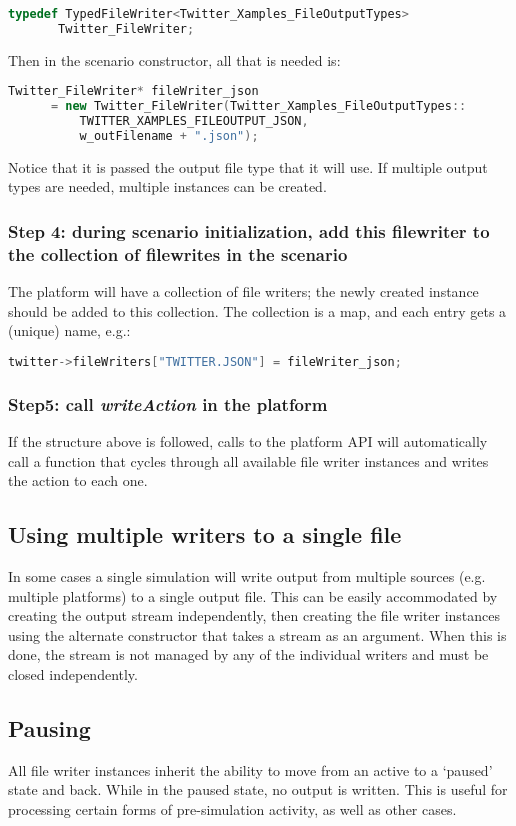 \begin{lstlisting}[frame=single, language=C++]
typedef TypedFileWriter<Twitter_Xamples_FileOutputTypes> 
       Twitter_FileWriter;
\end{lstlisting}

Then in the scenario constructor, all that is needed is:

\begin{lstlisting}[frame=single, language=C++]
Twitter_FileWriter* fileWriter_json 
      = new Twitter_FileWriter(Twitter_Xamples_FileOutputTypes::
          TWITTER_XAMPLES_FILEOUTPUT_JSON, 
          w_outFilename + ".json");
\end{lstlisting}

Notice that it is passed the output file type that it will use. If multiple output types are needed, multiple instances can be created.

\subsubsection{Step 4: during scenario initialization, add this filewriter to the collection of filewrites in the scenario}
The platform will have a collection of file writers; the newly created instance should be added to this collection. The collection is a map, and each entry gets a (unique) name, e.g.:

\begin{lstlisting}[frame=single, language=C++]
	twitter->fileWriters["TWITTER.JSON"] = fileWriter_json;
\end{lstlisting}

\subsubsection{Step5: call \textit{writeAction} in the platform}
If the structure above is followed, calls to the platform API will automatically call a function that cycles through all available file writer instances and writes the action to each one.

\subsection{Using multiple writers to a single file}
In some cases a single simulation will write output from multiple sources (e.g. multiple platforms) to a single output file. This can be easily accommodated by creating the output stream independently, then creating the file writer instances using the alternate constructor that takes a stream as an argument. When this is done, the stream is not managed by any of the individual writers and must be closed independently.

\subsection{Pausing}
All file writer instances inherit the ability to move from an active to a `paused' state and back. While in the paused state, no output is written. This is useful for processing certain forms of pre-simulation activity, as well as other cases.
